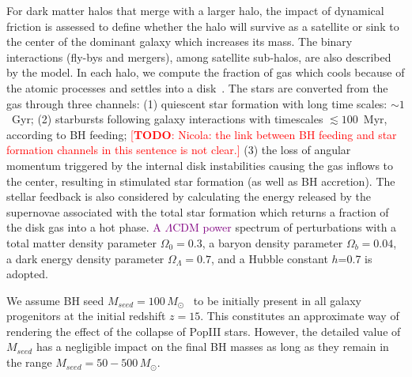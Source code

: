 \documentclass[twocolumn]{aastex631}
\newcommand{\todo}[1]{\textcolor{red}{[{\bf TODO}: #1]}}
\newcommand{\red}[1]{\textcolor{purple}{#1}}
\begin{document}
For dark matter halos that merge with a larger halo, the impact of dynamical friction is assessed to define whether the halo will survive as a satellite or sink to the center of the dominant galaxy which increases its mass. The binary interactions (fly-bys and mergers), among satellite sub-halos, are  also described by the model. In each halo, we compute the fraction of gas which cools because of the atomic processes and settles into a disk~\citep{Mo1998}. The stars are converted from the gas through three channels: (1) quiescent star formation with long time scales: $\sim1$~Gyr; (2) starbursts following galaxy interactions with timescales $\lesssim 100$~Myr, according to BH feeding; \todo{Nicola: the link between BH feeding and star formation channels in this sentence is not clear.} (3) the loss of angular momentum triggered by the internal disk instabilities causing the gas inflows to the center, resulting in stimulated star formation (as well as BH accretion). The stellar feedback is also considered by calculating the energy released by the supernovae associated with the total star formation which returns a fraction of the disk gas into a hot phase. %
\red{A $\Lambda$CDM power} spectrum of perturbations with a total matter density parameter $\Omega_0=0.3$, a baryon density parameter 
$\Omega_b=0.04$, a dark energy density parameter $\Omega_\Lambda=0.7$, and a Hubble constant $h$=0.7 is adopted.

{We assume BH seed $M_{seed}=100\,M_{\odot}$~\citep{Madau2001}  to be initially present in all galaxy progenitors at the initial redshift $z=15$. This constitutes an approximate way of rendering the effect of the collapse of PopIII stars. However, the detailed value of $M_{seed}$ has a negligible impact on the final BH masses as long as they remain in the range $M_{seed}=50-500\,M_{\odot}$.
}
\end{document}
